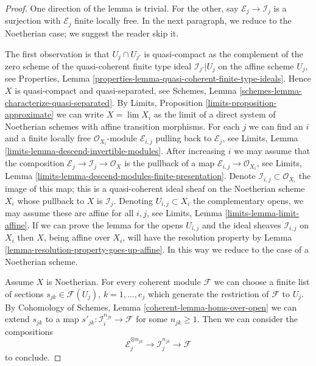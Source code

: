 \documentclass{stacks-project}
\theoremstyle{plain}
\theoremstyle{definition}
\theoremstyle{remark}
\numberwithin{equation}{subsection}
\def\lim{\mathop{\mathrm{lim}}\nolimits}
\begin{document}
\begin{proof}
One direction of the lemma is trivial. For the other, 
say $\mathcal{E}_j \to \mathcal{I}_j$ is a surjection with
$\mathcal{E}_j$ finite locally free. In the next paragraph, we
reduce to the Noetherian case; we suggest the reader skip it.

\medskip\noindent
The first observation is that $U_j \cap U_{j'}$ is quasi-compact
as the complement of the zero scheme of the quasi-coherent finite type ideal
$\mathcal{I}_{j'}|{U_j}$ on the affine scheme $U_j$, see
Properties, Lemma \ref{properties-lemma-quasi-coherent-finite-type-ideals}.
Hence $X$ is quasi-compact and quasi-separated, see
Schemes, Lemma \ref{schemes-lemma-characterize-quasi-separated}.
By Limits, Proposition \ref{limits-proposition-approximate}
we can write $X = \lim X_i$ as the limit of a direct system of
Noetherian schemes with affine transition morphisms. For each $j$
we can find an $i$ and a finite locally free $\mathcal{O}_{X_i}$-module
$\mathcal{E}_{i, j}$ pulling back to $\mathcal{E}_j$, see
Limits, Lemma \ref{limits-lemma-descend-invertible-modules}.
After increasing $i$ we may assume that the composition
$\mathcal{E}_j \to \mathcal{I}_j \to \mathcal{O}_X$ is the
pullback of a map $\mathcal{E}_{i, j} \to \mathcal{O}_{X_i}$, see
Limits, Lemma \ref{limits-lemma-descend-modules-finite-presentation}.
Denote $\mathcal{I}_{i, j} \subset \mathcal{O}_{X_i}$ the image
of this map; this is a quasi-coherent ideal sheaf on the Noetherian
scheme $X_i$ whose pullback to $X$ is $\mathcal{I}_j$.
Denoting $U_{i, j} \subset X_i$ the complementary opens, we
may assume these are affine for all $i, j$, see
Limits, Lemma \ref{limits-lemma-limit-affine}.
If we can prove the lemma for the opens $U_{i, j}$ and the
ideal sheaves $\mathcal{I}_{i, j}$ on $X_i$ then $X$, being affine
over $X_i$, will have the resolution property by
Lemma \ref{lemma-resolution-property-goes-up-affine}.
In this way we reduce to the case of a Noetherian scheme.

\medskip\noindent
Assume $X$ is Noetherian. For every coherent module $\mathcal{F}$
we can choose a finite list of sections $s_{jk} \in \mathcal{F}(U_j)$,
$k = 1, \ldots, e_j$ which generate the restriction of $\mathcal{F}$ to $U_j$.
By Cohomology of Schemes, Lemma \ref{coherent-lemma-homs-over-open}
we can extend $s_{jk}$ to a map
$s'_{jk} : \mathcal{I}_i^{n_{jk}} \to \mathcal{F}$ for some $n_{jk} \geq 1$.
Then we can consider the compositions
$$
\mathcal{E}_j^{\otimes n_{jk}} \to \mathcal{I}_j^{n_{jk}} \to \mathcal{F}
$$
to conclude.
\end{proof}
\end{document}
